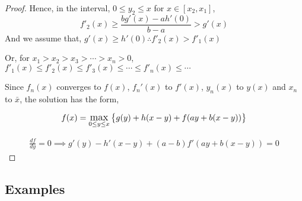 \begin{proof}
    Hence, in the interval, $0 \le y_2 \le x$ for $x \in [x_2, x_1]$,
    $$
        f'_2(x) \ge \frac{bg'(x) - ah'(0)}{b-a} > g'(x)
    $$
    And we assume that, $g'(x) \ge h'(0) \therefore f'_2(x) > f'_1(x)$

    Or, for $x_1 > x_2 > x_3 > \cdots > x_n > 0$, $f'_1(x) \le f'_2(x) \le f'_3(x) \le \cdots \le f'_{n}(x) \le \cdots$
    
    \vspace{5mm}
    Since $f_n (x)$ converges to $f(x)$, $f_n' (x)$ to $f' (x)$, $y_n (x)$ to $y (x)$ and $x_n$ to $\bar{x}$, the solution has the form, 

    $$
    f(x) = \mathlarger{\max}_{0 \le y \le x} \left\{ g(y) + h(x-y) + f(ay+b(x-y)) \right\}
    $$

    \begin{align*}
        \frac{df}{dy} = 0 
        \implies g'(y)-h'(x-y)+(a-b)f'(ay+b(x-y))=0
    \end{align*}
\end{proof}

\subsection{Examples}




